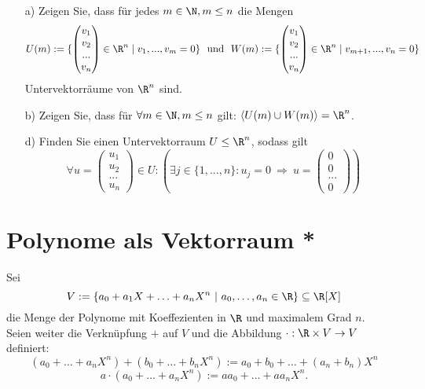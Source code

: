 \begin{itemize}
\item[a)] Zeigen Sie, dass für jedes $m \in \N, m\le n$ die Mengen
$$
U(m):= \{\begin{pmatrix} v_1 \\ v_2 \\ ... \\ v_n \end{pmatrix} \in \R^n \mid v_1,...,v_m =0 \} \ \text{ und } \ W(m) := \{\begin{pmatrix} v_1 \\ v_2 \\ ... \\ v_n \end{pmatrix} \in \R^n \mid v_{m+1},...,v_n =0 \}
$$ 
Untervektorräume von $\R^n$ sind.

\item[b)] Zeigen Sie, dass für $\forall m \in \N, m\le n$ gilt: $\langle U(m)\cup W(m) \rangle = \R^n$.

\item[d)] Finden Sie einen Untervektorraum $U \le \R^n$, sodass gilt
$$
\forall u=\begin{pmatrix} u_1 \\ u_2 \\ ... \\ u_n \end{pmatrix} \in U: ( \exists j \in \{1,...,n\}: u_j=0 \ \Rightarrow \ u=\begin{pmatrix} 0 \\ 0 \\ ... \\ 0 \end{pmatrix} )
$$
\end{itemize}


\section{Polynome als Vektorraum *}

Sei
$$
	V := \{a_0 +a_1X+\ldots +a_nX^n~|~ a_0,\ldots, a_n\in \R \} \subseteq \R[X]
$$
die Menge der Polynome mit Koeffezienten in $\R$ und maximalem Grad $n$.\\

Seien weiter die Verkn\"upfung $+$ auf $V$ und die Abbildung $\cdot: \R\times V \to V$ definiert:
$$
	(a_0 +\ldots +a_nX^n) + (b_0 +\ldots +b_nX^n) := a_0 +b_0+\ldots +(a_n+b_n)X^n
$$
$$
	a\cdot(a_0 +\ldots +a_nX^n) := aa_0 +\ldots +aa_nX^n.
$$

